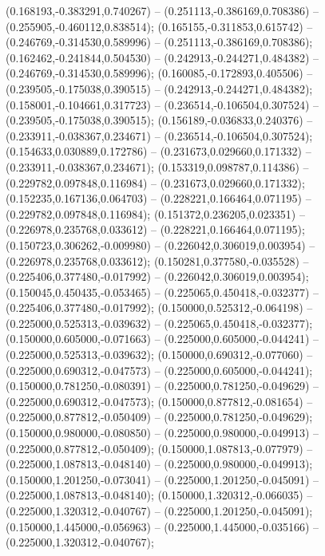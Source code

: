  (0.168193,-0.383291,0.740267) -- (0.251113,-0.386169,0.708386) -- (0.255905,-0.460112,0.838514);
 (0.165155,-0.311853,0.615742) -- (0.246769,-0.314530,0.589996) -- (0.251113,-0.386169,0.708386);
 (0.162462,-0.241844,0.504530) -- (0.242913,-0.244271,0.484382) -- (0.246769,-0.314530,0.589996);
 (0.160085,-0.172893,0.405506) -- (0.239505,-0.175038,0.390515) -- (0.242913,-0.244271,0.484382);
 (0.158001,-0.104661,0.317723) -- (0.236514,-0.106504,0.307524) -- (0.239505,-0.175038,0.390515);
 (0.156189,-0.036833,0.240376) -- (0.233911,-0.038367,0.234671) -- (0.236514,-0.106504,0.307524);
 (0.154633,0.030889,0.172786) -- (0.231673,0.029660,0.171332) -- (0.233911,-0.038367,0.234671);
 (0.153319,0.098787,0.114386) -- (0.229782,0.097848,0.116984) -- (0.231673,0.029660,0.171332);
 (0.152235,0.167136,0.064703) -- (0.228221,0.166464,0.071195) -- (0.229782,0.097848,0.116984);
 (0.151372,0.236205,0.023351) -- (0.226978,0.235768,0.033612) -- (0.228221,0.166464,0.071195);
 (0.150723,0.306262,-0.009980) -- (0.226042,0.306019,0.003954) -- (0.226978,0.235768,0.033612);
 (0.150281,0.377580,-0.035528) -- (0.225406,0.377480,-0.017992) -- (0.226042,0.306019,0.003954);
 (0.150045,0.450435,-0.053465) -- (0.225065,0.450418,-0.032377) -- (0.225406,0.377480,-0.017992);
 (0.150000,0.525312,-0.064198) -- (0.225000,0.525313,-0.039632) -- (0.225065,0.450418,-0.032377);
 (0.150000,0.605000,-0.071663) -- (0.225000,0.605000,-0.044241) -- (0.225000,0.525313,-0.039632);
 (0.150000,0.690312,-0.077060) -- (0.225000,0.690312,-0.047573) -- (0.225000,0.605000,-0.044241);
 (0.150000,0.781250,-0.080391) -- (0.225000,0.781250,-0.049629) -- (0.225000,0.690312,-0.047573);
 (0.150000,0.877812,-0.081654) -- (0.225000,0.877812,-0.050409) -- (0.225000,0.781250,-0.049629);
 (0.150000,0.980000,-0.080850) -- (0.225000,0.980000,-0.049913) -- (0.225000,0.877812,-0.050409);
 (0.150000,1.087813,-0.077979) -- (0.225000,1.087813,-0.048140) -- (0.225000,0.980000,-0.049913);
 (0.150000,1.201250,-0.073041) -- (0.225000,1.201250,-0.045091) -- (0.225000,1.087813,-0.048140);
 (0.150000,1.320312,-0.066035) -- (0.225000,1.320312,-0.040767) -- (0.225000,1.201250,-0.045091);
 (0.150000,1.445000,-0.056963) -- (0.225000,1.445000,-0.035166) -- (0.225000,1.320312,-0.040767);
